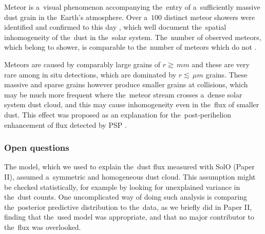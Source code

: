 Meteor is a~visual phenomenon accompanying the~entry of a~sufficiently massive dust grain in the~Earth's atmosphere. Over a~$100$ distinct meteor showers were identified and confirmed to this day \citep{jenniskens2020removing}, which well document the~spatial inhomogeneity of the~dust in the~solar system. The~number of observed meteors, which belong to shower, is comparable to the~number of meteors which do not \citep{jenniskens2016cams}. 

Meteors are caused by comparably large grains of $r \gtrsim \, \si{mm}$ and these are very rare among in situ detections, which are dominated by $r \lesssim \, \si{\mu m}$ grains. These massive and sparse grains however produce smaller grains at collisions, which may be much more frequent where the~meteor stream crosses a~dense solar system dust cloud, and this may cause inhomogeneity even in the~flux of smaller dust. This effect was proposed as an explanation for the~post-perihelion enhancement of flux detected by PSP \citep{szalay2021collisional}. 

\subsubsection{Open questions}

The model, which we used to explain the~dust flux measured with SolO (Paper II), assumed a~symmetric and homogeneous dust cloud. This assumption might be checked statistically, for example by looking for unexplained variance in the~dust counts. One uncomplicated way of doing such analysis is comparing the~posterior predictive distribution to the~data, as we briefly did in Paper II, finding that the~used model was appropriate, and that no major contributor to the~flux was overlooked. 






